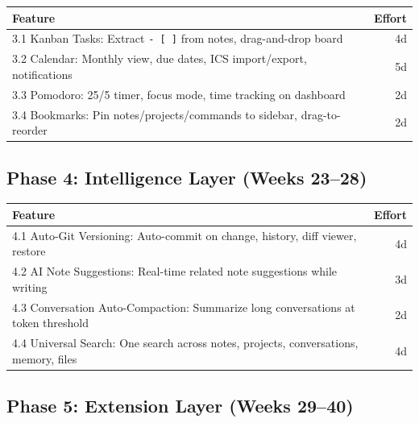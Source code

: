 \documentclass[11pt,a4paper]{article}
\begin{document}
\begin{table}[h]\centering\small
\begin{tabularx}{\textwidth}{Xr}
\toprule
\textbf{Feature} & \textbf{Effort} \\
\midrule
3.1 Kanban Tasks: Extract \texttt{- [ ]} from notes, drag-and-drop board & 4d \\
3.2 Calendar: Monthly view, due dates, ICS import/export, notifications & 5d \\
3.3 Pomodoro: 25/5 timer, focus mode, time tracking on dashboard & 2d \\
3.4 Bookmarks: Pin notes/projects/commands to sidebar, drag-to-reorder & 2d \\
\bottomrule
\end{tabularx}
\end{table}

\subsection{Phase 4: Intelligence Layer (Weeks 23--28)}

\begin{table}[h]\centering\small
\begin{tabularx}{\textwidth}{Xr}
\toprule
\textbf{Feature} & \textbf{Effort} \\
\midrule
4.1 Auto-Git Versioning: Auto-commit on change, history, diff viewer, restore & 4d \\
4.2 AI Note Suggestions: Real-time related note suggestions while writing & 3d \\
4.3 Conversation Auto-Compaction: Summarize long conversations at token threshold & 2d \\
4.4 Universal Search: One search across notes, projects, conversations, memory, files & 4d \\
\bottomrule
\end{tabularx}
\end{table}

\subsection{Phase 5: Extension Layer (Weeks 29--40)}
\end{document}
